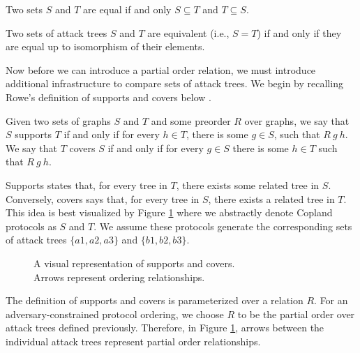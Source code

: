 \documentclass[runningheads]{llncs}
\theoremstyle{definition}
\begin{document}
\begin{definition}
  Two sets $S$ and $T$ are equal if and only $S \subseteq T$ and $T \subseteq S$.
\end{definition}

\begin{definition}[Equivalence =]
    Two sets of attack trees $S$ and $T$ are equivalent (i.e., $S = T$) if and only if they are equal up to isomorphism of their elements.
\end{definition}

Now before we can introduce a partial order relation, we must introduce additional infrastructure to compare sets of attack trees. We begin by recalling Rowe's definition of supports and covers below \cite{Rowe:2021:OnOrdering}.

\begin{definition}
    Given two sets of graphs $S$ and $T$ and some preorder $R$ over graphs, we say that $S$ supports $T$ if and only if for every $h \in T$, there is some $g \in S$, such that $R\: g\: h$. We  say that $T$ covers $S$ if and only if for every $g \in S$ there is some $h \in T$ such that $R\: g\: h$.
\end{definition}

Supports states that, for every tree in $T$, there exists some related tree in $S$. Conversely, covers says that, for every tree in $S$, there exists a related tree in $T$.  This idea is best visualized by Figure \ref{fig:sup-cov} where we abstractly denote Copland protocols as $S$ and $T$. We assume these protocols generate the corresponding sets of attack trees $\{a1, a2 , a3 \}$ and $ \{b1, b2 ,b3\}$.

\begin{figure}[htbp]
    \centering
    
    \captionsetup{justification=centering,margin=1cm}
    \caption[Supports and covers]{A visual representation of supports and covers. \\ Arrows represent ordering relationships.}
    \label{fig:sup-cov}
\end{figure}

The definition of supports and covers is parameterized over a relation $R$. For an adversary-constrained protocol ordering, we choose $R$ to be the partial order over attack trees defined previously. Therefore, in Figure \ref{fig:sup-cov}, arrows between the individual attack trees represent partial order relationships.
\end{document}
